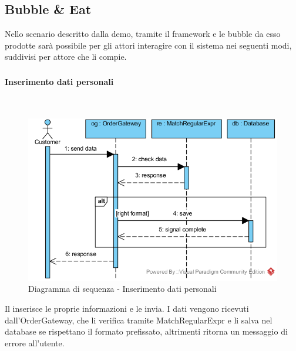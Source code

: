 \subsection{Bubble \& Eat}
Nello scenario descritto dalla demo, tramite il framework e le bubble da esso prodotte sarà possibile per gli attori interagire con il sistema nei seguenti modi, suddivisi per attore che li compie.

\subsubsection{\Customer{}}
\begin{samepage}
\paragraph{Inserimento dati personali}\mbox{}\\
\end{samepage}
\begin{figure}[H]
	\centering
	\includegraphics[width=14cm]{diagrammi_img/sequenza/cliente_inserisci_informazioni.png}
	\caption{Diagramma di sequenza - Inserimento dati personali}
\end{figure}
Il \Customer{} inserisce le proprie informazioni e le invia. I dati vengono ricevuti dall'Order\-Gateway, che li verifica tramite MatchRegularExpr e li salva nel database se rispettano il formato prefissato, altrimenti ritorna un messaggio di errore all'utente.

